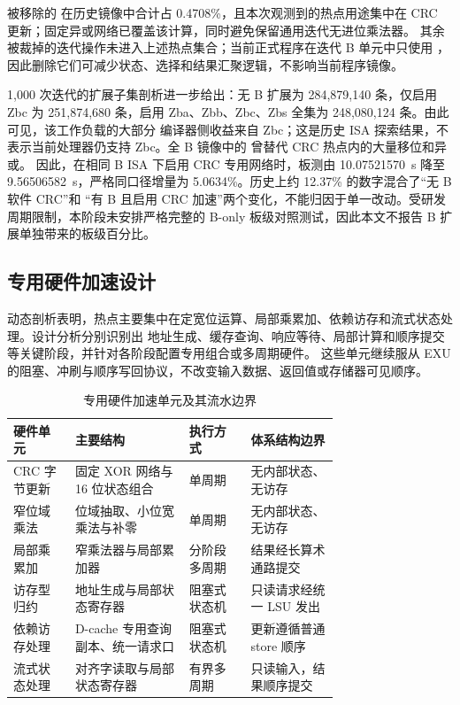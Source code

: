 被移除的  在历史镜像中合计占 0.4708\%，且本次观测到的热点用途集中在 CRC
更新；固定异或网络已覆盖该计算，同时避免保留通用迭代无进位乘法器。
其余被裁掉的迭代操作未进入上述热点集合；当前正式程序在迭代 B 单元中只使用
，因此删除它们可减少状态、选择和结果汇聚逻辑，不影响当前程序镜像。

1,000 次迭代的扩展子集剖析进一步给出：无 B 扩展为 284,879,140 条，仅启用 Zbc 为
251,874,680 条，启用 Zba、Zbb、Zbc、Zbs 全集为 248,080,124 条。由此可见，该工作负载的大部分
编译器侧收益来自 Zbc；这是历史 ISA 探索结果，不表示当前处理器仍支持 Zbc。全 B 镜像中的
 曾替代 CRC 热点内的大量移位和异或。
因此，在相同 B ISA 下启用 CRC 专用网络时，板测由 10.07521570~s 降至
9.56506582~s，严格同口径增量为 5.0634\%。历史上约 12.37\% 的数字混合了“无 B 软件 CRC”和
“有 B 且启用 CRC 加速”两个变化，不能归因于单一改动。受研发周期限制，本阶段未安排严格完整的
B-only 板级对照测试，因此本文不报告 B 扩展单独带来的板级百分比。

\subsection{专用硬件加速设计}\label{sec:custom}

动态剖析表明，热点主要集中在定宽位运算、局部乘累加、依赖访存和流式状态处理。设计分析分别识别出
地址生成、缓存查询、响应等待、局部计算和顺序提交等关键阶段，并针对各阶段配置专用组合或多周期硬件。
这些单元继续服从 EXU 的阻塞、冲刷与顺序写回协议，不改变输入数据、返回值或存储器可见顺序。

\begin{table}[H]\centering\scriptsize
\caption{专用硬件加速单元及其流水边界}\label{tab:accelerator-units}
\begin{tabularx}{\linewidth}{@{}p{0.19\linewidth}p{0.35\linewidth}p{0.19\linewidth}Y@{}}
\toprule
\textbf{硬件单元}&\textbf{主要结构}&\textbf{执行方式}&\textbf{体系结构边界}\\\midrule
CRC 字节更新&固定 XOR 网络与 16 位状态组合&单周期&无内部状态、无访存\\
窄位域乘法&位域抽取、小位宽乘法与补零&单周期&无内部状态、无访存\\
局部乘累加&窄乘法器与局部累加器&分阶段多周期&结果经长算术通路提交\\
访存型归约&地址生成与局部状态寄存器&阻塞式状态机&只读请求经统一 LSU 发出\\
依赖访存处理&D-cache 专用查询副本、统一请求口&阻塞式状态机&更新遵循普通 store 顺序\\
流式状态处理&对齐字读取与局部状态寄存器&有界多周期&只读输入，结果顺序提交\\
\bottomrule
\end{tabularx}
\normalsize\end{table}

